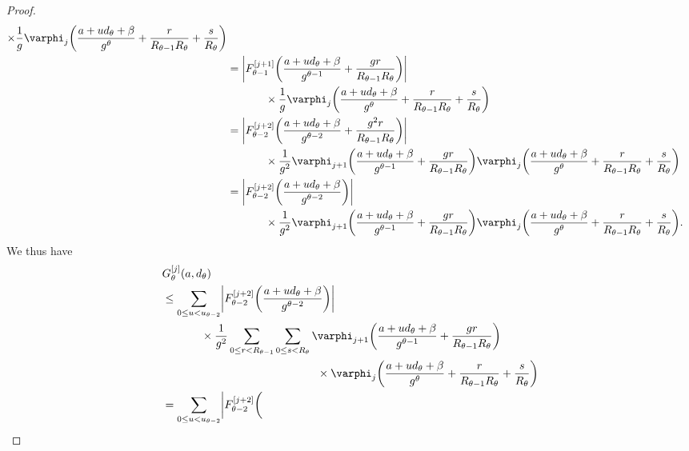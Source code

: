 \documentclass[hidelinks]{amsart}
\numberwithin{equation}{section}
\theoremstyle{plain}
\theoremstyle{definition}
\let\tmp\phi
\let\phi\varphi
\let\varphi\tmp
\let\tmp\epsilon
\let\epsilon\varepsilon
\let\varepsilon\tmp
\begin{document}
\begin{proof}
\begin{align}
\times
\frac{1}{g}\phi_{j}\biggl(
\frac{a+ud_{\theta}+\beta}{g^{\theta}}
+\frac{r}{R_{\theta-1}R_{\theta}}
+\frac{s}{R_{\theta}}
\biggr)\\
&=
\biggl|F_{\theta-1}^{[j+1]}\biggl(
\frac{a+ud_{\theta}+\beta}{g^{\theta-1}}
+\frac{gr}{R_{\theta-1}R_{\theta}}
\biggr)\biggr|\\
&\hspace{0.1\textwidth}
\times
\frac{1}{g}\phi_{j}\biggl(
\frac{a+ud_{\theta}+\beta}{g^{\theta}}
+\frac{r}{R_{\theta-1}R_{\theta}}
+\frac{s}{R_{\theta}}
\biggr)\\
&=
\biggl|F_{\theta-2}^{[j+2]}\biggl(
\frac{a+ud_{\theta}+\beta}{g^{\theta-2}}
+\frac{g^{2}r}{R_{\theta-1}R_{\theta}}
\biggr)\biggr|\\
&\hspace{0.1\textwidth}
\times
\frac{1}{g^{2}}
\phi_{j+1}\biggl(
\frac{a+ud_{\theta}+\beta}{g^{\theta-1}}
+\frac{gr}{R_{\theta-1}R_{\theta}}
\biggr)
\phi_{j}\biggl(
\frac{a+ud_{\theta}+\beta}{g^{\theta}}
+\frac{r}{R_{\theta-1}R_{\theta}}
+\frac{s}{R_{\theta}}
\biggr)\\
&=
\biggl|F_{\theta-2}^{[j+2]}\biggl(
\frac{a+ud_{\theta}+\beta}{g^{\theta-2}}
\biggr)\biggr|\\
&\hspace{0.1\textwidth}
\times
\frac{1}{g^{2}}
\phi_{j+1}\biggl(
\frac{a+ud_{\theta}+\beta}{g^{\theta-1}}
+\frac{gr}{R_{\theta-1}R_{\theta}}
\biggr)
\phi_{j}\biggl(
\frac{a+ud_{\theta}+\beta}{g^{\theta}}
+\frac{r}{R_{\theta-1}R_{\theta}}
+\frac{s}{R_{\theta}}
\biggr).
\end{align}
We thus have
\begin{equation}
\label{lem:F_L1_moment:two_step:prefinal}
\begin{aligned}
&G_{\theta}^{[j]}(a,d_{\theta})\\
&\le
\sum_{0\le u<u_{\theta-2}}
\biggl|F_{\theta-2}^{[j+2]}\biggl(
\frac{a+ud_{\theta}+\beta}{g^{\theta-2}}
\biggr)\biggr|\\
&\hspace{0.1\textwidth}
\times
\frac{1}{g^{2}}
\sum_{0\le r<R_{\theta-1}}
\sum_{0\le s<R_{\theta}}
\phi_{j+1}\biggl(
\frac{a+ud_{\theta}+\beta}{g^{\theta-1}}
+\frac{gr}{R_{\theta-1}R_{\theta}}
\biggr)\\
&\hspace{0.4\textwidth}
\times
\phi_{j}\biggl(
\frac{a+ud_{\theta}+\beta}{g^{\theta}}
+\frac{r}{R_{\theta-1}R_{\theta}}
+\frac{s}{R_{\theta}}
\biggr)\\
&=
\sum_{0\le u<u_{\theta-2}}
\biggl|F_{\theta-2}^{[j+2]}\biggl(

\end{aligned}
\end{equation}
\end{proof}
\end{document}
